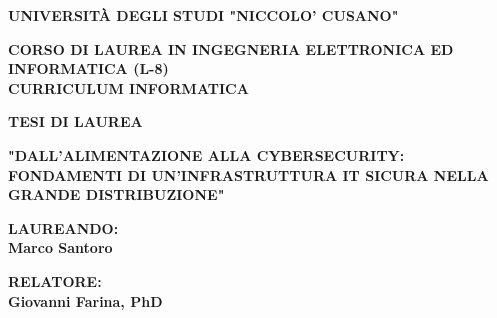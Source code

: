 \begin{titlepage}
    \setmainfont{Times New Roman} 
    \begin{center}
        \vspace*{2cm}
        
        {\Large \textbf{UNIVERSITÀ DEGLI STUDI "NICCOLO' CUSANO"}}\\
        \vspace{0.5cm}
        
        {\large \textbf{CORSO DI LAUREA IN INGEGNERIA ELETTRONICA ED INFORMATICA (L-8)\\ CURRICULUM INFORMATICA}}\\
        
        \vspace{3cm}

        {\large \textbf{TESI DI LAUREA}}\\
        
        \vspace{2cm}
        
        {\Large \textbf{"DALL'ALIMENTAZIONE ALLA CYBERSECURITY: FONDAMENTI DI UN'INFRASTRUTTURA IT SICURA NELLA GRANDE DISTRIBUZIONE"}}        
        \vspace{4cm}
        
        
        \begin{minipage}{0.4\textwidth}
        \begin{flushleft} \large
        \textbf{LAUREANDO:}\\ \textbf{Marco Santoro}
        \end{flushleft}
        \end{minipage}
        \begin{minipage}{0.4\textwidth}
        \begin{flushright} \large
        \textbf{RELATORE:} \\
        \textbf{Giovanni Farina, PhD}
        \end{flushright}
        \end{minipage}
        \vfill %
        \vspace*{1cm}
        


\end{center}
\end{titlepage}
